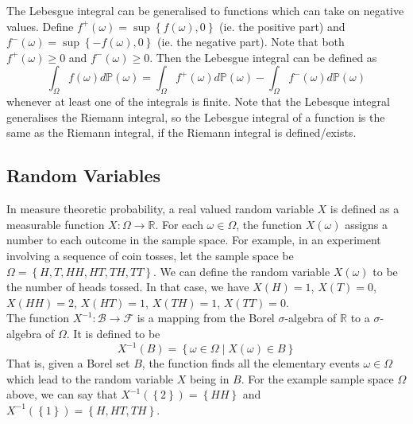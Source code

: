 \documentclass[11pt]{report} %
\begin{document}
The Lebesgue integral can be generalised to functions which can take on negative values. Define $f^{+}\left(\omega\right) = \sup\left\{f\left(\omega\right), 0\right\}$ (ie. the positive part) and $f^{-}\left(\omega\right) = \sup\left\{-f\left(\omega\right), 0\right\}$ (ie. the negative part). Note that both $f^{+}\left(\omega\right) \geq 0$ and $f^{-}\left(\omega\right) \geq 0$. Then the Lebesgue integral can be defined as
\begin{equation}
\int_{\Omega}f\left(\omega\right)d\mathbb{P}\left(\omega\right) = \int_{\Omega}f^{+}\left(\omega\right)d\mathbb{P}\left(\omega\right) - \int_{\Omega}f^{-}\left(\omega\right)d\mathbb{P}\left(\omega\right)
\end{equation}
whenever at least one of the integrals is finite. Note that the Lebesque integral generalises the Riemann integral, so the Lebesgue integral of a function is the same as the Riemann integral, if the Riemann integral is defined/exists.

\subsection{Random Variables}

In measure theoretic probability, a real valued random variable $X$ is defined as a measurable function $X: \Omega \to \mathbb{R}$. For each $\omega \in \Omega$, the function $X\left(\omega\right)$ assigns a number to each outcome in the sample space. For example, in an experiment involving a sequence of coin tosses, let the sample space be $\Omega = \left\{H, T, HH, HT, TH, TT\right\}$. We can define the random variable $X\left(\omega\right)$ to be the number of heads tossed. In that case, we have $X\left(H\right) = 1$, $X\left(T\right) = 0$, $X\left(HH\right) = 2$, $X\left(HT\right) = 1$, $X\left(TH\right) = 1$, $X\left(TT\right) = 0$. \\

The function $X^{-1}: \mathcal{B} \to \mathcal{F}$ is a mapping from the Borel $\sigma$-algebra of $\mathbb{R}$ to a $\sigma$-algebra of $\Omega$. It is defined to be
\begin{equation}
X^{-1}\left(B\right) = \left\{\omega\in\Omega\middle|X\left(\omega\right)\in B\right\}
\end{equation}
That is, given a Borel set $B$, the function finds all the elementary events $\omega\in\Omega$ which lead to the random variable $X$ being in $B$. For the example sample space $\Omega$ above, we can say that $X^{-1}\left(\left\{2\right\}\right) = \left\{HH\right\}$ and $X^{-1}\left(\left\{1\right\}\right) = \left\{H, HT, TH\right\}$.
\end{document}

